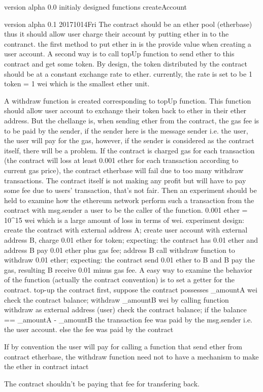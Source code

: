
version alpha 0.0 
initialy designed functions
createAccount




version alpha 0.1 20171014Fri
The contract should be an ether pool (etherbase)
thus it should allow user charge their account by putting ether in to the contranct.
the first method to put ether in is the provide value when creating a user account.
A second way is to call topUp function to send ether to this contract and get some token.
By design, the token distributed by the contract should be at a constant exchange rate to ether.
currently, the rate is set to be 1 token = 1 wei which is the smallest ether unit.

A withdraw function is created corresponding to topUp function.
This function should allow user account to exchange their token back to ether in their ether address.
But the chellange is, when sending ether from the contract, the gas fee is to be paid by the sender, if the sender here is the message sender i.e. the user,
the user will pay for the gas, however, if the sender is considered as the contract itself, there will be a problem.
If the contract is charged gas for each transaction (the contract will loss at least 0.001 ether for each transaction according to current gas price),
the contract etherbase will fail due to too many withdraw transactions. The contract itself is not making any profit but will have to pay some fee due to users' transaction,
that's not fair.
Then an experiment should be held to examine how the ethereum network perform such a transaction from the contract with msg.sender a user to be the caller of the function.
0.001 ether = 10^15 wei which is a large amount of loss in terms of wei.
    experiment design:
    create the contract with external address A;
    create user account with external address B, charge 0.01 ether for token;
        expecting: the contract has 0.01 ether and address B pay 0.01 ether plus gas fee;
    address B call withdraw function to withdraw 0.01 ether;
        expecting: the contract send 0.01 ether to B and B pay the gas, resulting B receive 0.01 minus gas fee.
    A easy way to examine the behavior of the function (actually the contract convention) is to set a getter for the contract.
    top-up the contract first, suppose the contract possesses _amountA wei
        check the contract balance;
    withdraw _amountB wei by calling function withdraw as external address (user)
        check the contract balance;
        if the balance == _amountA - _amountB
            the transaction fee was paid by the msg.sender i.e. the user account.
        else
            the fee was paid by the contract

    If by convention the user will pay for calling a function that send ether from contract etherbase, 
    the withdraw function need not to have a mechanism to make the ether in contract intact
    
The contract shouldn't be paying that fee for transfering back. 
